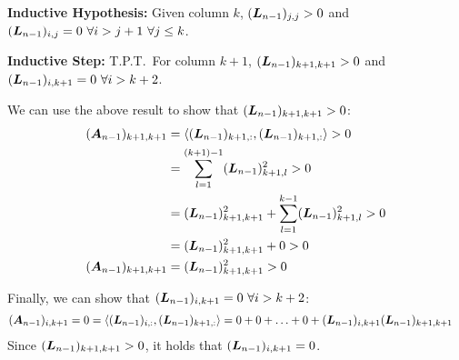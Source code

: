 \documentclass[]{exam}
\begin{document}
\begin{questions}
\begin{enumerate}[label=\arabic*.]
		\textbf{Inductive Hypothesis:} Given column $k$, $(\boldsymbol{L}_{n-1})_{j,j} > 0$ and $(\boldsymbol{L}_{n-1})_{i,j} = 0~\forall i > j + 1~\forall j \leq k$.

		\textbf{Inductive Step:} T.P.T.~For column $k+1$, $(\boldsymbol{L}_{n-1})_{k+1,k+1} > 0$ and $(\boldsymbol{L}_{n-1})_{i,k+1} = 0~\forall i > k + 2$.

		We can use the above result to show that $(\boldsymbol{L}_{n-1})_{k + 1, k+1} > 0$:
		\begin{align*}
			(\boldsymbol{A}_{n-1})_{k+1, k+1} &= \langle (\boldsymbol{L}_{n-1})_{k + 1, :}, (\boldsymbol{L}_{n-1})_{k + 1, :} \rangle  > 0\\
			&= \sum^{(k+1)-1}_{l=1} (\boldsymbol{L}_{n-1})_{k + 1, l}^2 > 0 \\
			&= (\boldsymbol{L}_{n-1})_{k + 1, k+1}^2 + \sum^{k-1}_{l=1} (\boldsymbol{L}_{n-1})_{k + 1, l}^2 > 0 \\
			&= (\boldsymbol{L}_{n-1})_{k + 1, k+1}^2 + 0 > 0 \\
			(\boldsymbol{A}_{n-1})_{k+1, k+1} &= (\boldsymbol{L}_{n-1})_{k + 1, k+1}^2 > 0
		\end{align*}

		Finally, we can show that $(\boldsymbol{L}_{n-1})_{i,k + 1} = 0~\forall i > k + 2$:
		\begin{align*}
			(\boldsymbol{A}_{n-1})_{i, k+1} &= 0 = \langle (\boldsymbol{L}_{n-1})_{i, :}, (\boldsymbol{L}_{n-1})_{k+1, :} \rangle = 0 + 0 + \ldots + 0 + (\boldsymbol{L}_{n-1})_{i, k+1} (\boldsymbol{L}_{n-1})_{k+1, k+1}
		\end{align*}
		Since $(\boldsymbol{L}_{n-1})_{k + 1, k+1} > 0$, it holds that $(\boldsymbol{L}_{n-1})_{i, k+1} = 0$.


\end{enumerate}
\end{questions}
\end{document}

